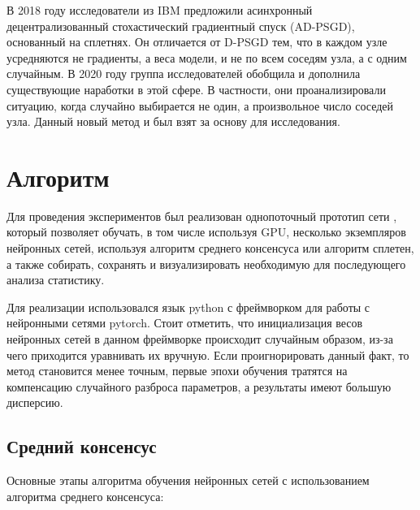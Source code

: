 \documentclass[a4paper,article,14pt]{extarticle}
\begin{document}
В 2018 году исследователи из IBM предложили \cite{o11} асинхронный децентрализованный стохастический градиентный спуск (AD-PSGD), основанный на сплетнях. Он отличается от D-PSGD тем, что в каждом узле усредняются не градиенты, а веса модели, и не по всем соседям узла, а с одним случайным. В 2020 году группа исследователей \cite{decentralized_sgd} обобщила и дополнила существующие наработки в этой сфере. В частности, они проанализировали ситуацию, когда случайно выбирается не один, а произвольное число соседей узла. Данный новый метод и был взят за основу для исследования.


\pagebreak
\section{Алгоритм}
Для проведения экспериментов был реализован однопоточный прототип сети \cite{github}, который позволяет обучать, в том числе используя GPU, несколько экземпляров нейронных сетей, используя алгоритм среднего консенсуса или алгоритм сплетен, а также собирать, сохранять и визуализировать необходимую для последующего анализа статистику.

Для реализации использовался язык python с фреймворком для работы с нейронными сетями pytorch. Стоит отметить, что инициализация весов нейронных сетей в данном фреймворке происходит случайным образом, из-за чего приходится уравнивать их вручную. Если проигнорировать данный факт, то метод становится менее точным, первые эпохи обучения тратятся на компенсацию случайного разброса параметров, а результаты имеют большую дисперсию.
\subsection{Средний консенсус}
Основные этапы алгоритма обучения нейронных сетей с использованием алгоритма среднего консенсуса:
\end{document}
